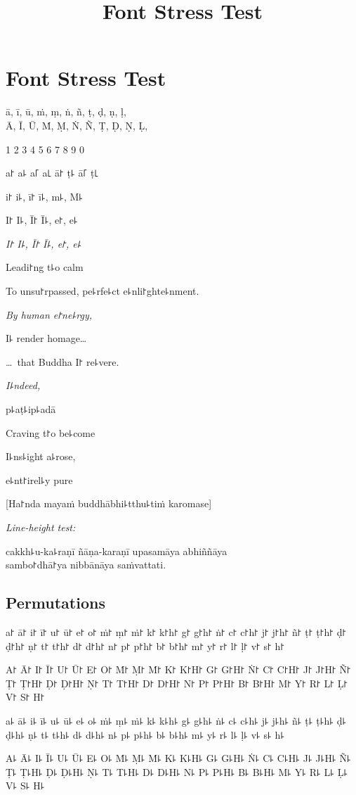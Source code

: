 \documentclass[ babelLanguage=english, final, ]{chantingbook}
\title{Font Stress Test}
\begin{document}
\mainmatter

\chapter{Font Stress Test}

\begin{multicols}{2}

ā, ī, ū, ṁ, ṃ, ṅ, ñ, ṭ, ḍ, ṇ, ḷ,\\
Ā, Ī, Ū, Ṁ, Ṃ, Ṅ, Ñ, Ṭ, Ḍ, Ṇ, Ḷ,

\columnbreak

1 2 3 4 5 6 7 8 9 0

\end{multicols}

\begin{multicols}{2}

a꜓ a꜕ a꜒ a꜖ ā꜓ ṭ꜕ ā꜒ ṭ꜖

i꜓ i꜕, ī꜓ ī꜕, m꜕, M꜕

I꜓ I꜕, Ī꜓ Ī꜕, e꜓, e꜕

\textit{I꜓ I꜕, Ī꜓ Ī꜕, e꜓, e꜕}

Leadi꜓ng t꜕o calm

To unsu꜓rpassed, pe꜕rfe꜕ct e꜕nli꜓ghte꜕nment.

\textit{By human e꜓ne꜕rgy,}

I꜕ render homage\ldots

\ldots\ that Buddha I꜓ re꜕vere.

\textit{I꜕ndeed,}

p꜕aṭ꜕ip꜕adā

Craving t꜓o be꜕come

I꜕ns꜕ight a꜕rose,

e꜕nt꜓irel꜕y pure

\end{multicols}

[Ha꜓nda mayaṁ buddhābhi꜕tthu꜕tiṁ karomase]

\textit{Line-height test:}

cakkh꜕u-ka꜕raṇī ñāṇa-karaṇī upasamāya abhiññāya\\
sambo꜓dhā꜓ya nibbānāya saṁvattati.

\section{Permutations}

a꜓ ā꜓ i꜓ ī꜓ u꜓ ū꜓ e꜓ o꜓ ṁ꜓ ṃ꜓ ṁ꜓ k꜓ k꜓h꜓ g꜓ g꜓h꜓ ṅ꜓ c꜓ c꜓h꜓ j꜓ j꜓h꜓ ñ꜓ ṭ꜓
ṭ꜓h꜓ ḍ꜓ ḍ꜓h꜓ ṇ꜓ t꜓ t꜓h꜓ d꜓ d꜓h꜓ n꜓ p꜓ p꜓h꜓ b꜓ b꜓h꜓ m꜓ y꜓ r꜓ l꜓ ḷ꜓ v꜓ s꜓ h꜓

A꜓ Ā꜓ I꜓ Ī꜓ U꜓ Ū꜓ E꜓ O꜓ Ṁ꜓ Ṃ꜓ Ṁ꜓ K꜓ K꜓H꜓ G꜓ G꜓H꜓ Ṅ꜓ C꜓ C꜓H꜓ J꜓ J꜓H꜓ Ñ꜓ Ṭ꜓
Ṭ꜓H꜓ Ḍ꜓ Ḍ꜓H꜓ Ṇ꜓ T꜓ T꜓H꜓ D꜓ D꜓H꜓ N꜓ P꜓ P꜓H꜓ B꜓ B꜓H꜓ M꜓ Y꜓ R꜓ L꜓ Ḷ꜓ V꜓ S꜓ H꜓

a꜕ ā꜕ i꜕ ī꜕ u꜕ ū꜕ e꜕ o꜕ ṁ꜕ ṃ꜕ ṁ꜕ k꜕ k꜕h꜕ g꜕ g꜕h꜕ ṅ꜕ c꜕ c꜕h꜕ j꜕ j꜕h꜕ ñ꜕ ṭ꜕
ṭ꜕h꜕ ḍ꜕ ḍ꜕h꜕ ṇ꜕ t꜕ t꜕h꜕ d꜕ d꜕h꜕ n꜕ p꜕ p꜕h꜕ b꜕ b꜕h꜕ m꜕ y꜕ r꜕ l꜕ ḷ꜕ v꜕ s꜕ h꜕

A꜕ Ā꜕ I꜕ Ī꜕ U꜕ Ū꜕ E꜕ O꜕ Ṁ꜕ Ṃ꜕ Ṁ꜕ K꜕ K꜕H꜕ G꜕ G꜕H꜕ Ṅ꜕ C꜕ C꜕H꜕ J꜕ J꜕H꜕ Ñ꜕ Ṭ꜕
Ṭ꜕H꜕ Ḍ꜕ Ḍ꜕H꜕ Ṇ꜕ T꜕ T꜕H꜕ D꜕ D꜕H꜕ N꜕ P꜕ P꜕H꜕ B꜕ B꜕H꜕ M꜕ Y꜕ R꜕ L꜕ Ḷ꜕ V꜕ S꜕ H꜕
\end{document}
